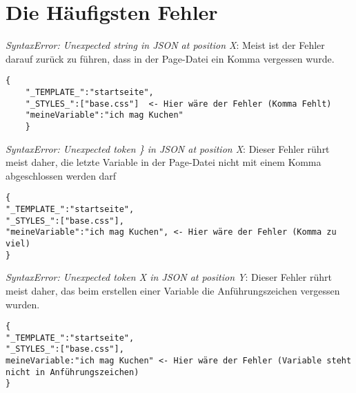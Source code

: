 \documentclass[ngerman,a4paper]{scrartcl}
\begin{document}
\section{Die Häufigsten Fehler}
\textit{SyntaxError: Unexpected string in JSON at position X}: 
\newline
Meist ist der Fehler darauf zurück zu führen, dass in der Page-Datei 
ein Komma vergessen wurde.
\begin{lstlisting}[style=JSSTE]
	{
	"_TEMPLATE_":"startseite",
	"_STYLES_":["base.css"]  <- Hier wäre der Fehler (Komma Fehlt)
	"meineVariable":"ich mag Kuchen"
	}
\end{lstlisting}

\textit{SyntaxError: Unexpected token \} in JSON at position X}: 
\newline
Dieser Fehler rührt meist daher, die letzte Variable in der Page-Datei nicht mit einem Komma abgeschlossen werden darf
\begin{lstlisting}[style=JSSTE]
{
"_TEMPLATE_":"startseite",
"_STYLES_":["base.css"],  
"meineVariable":"ich mag Kuchen", <- Hier wäre der Fehler (Komma zu viel)
}
\end{lstlisting}

\textit{SyntaxError: Unexpected token X in JSON at position Y}: 
\newline
Dieser Fehler rührt meist daher, das beim erstellen einer Variable die Anführungszeichen vergessen wurden.
\begin{lstlisting}[style=JSSTE]
{
"_TEMPLATE_":"startseite",
"_STYLES_":["base.css"],  
meineVariable:"ich mag Kuchen" <- Hier wäre der Fehler (Variable steht nicht in Anführungszeichen)
}
\end{lstlisting}
\end{document}
